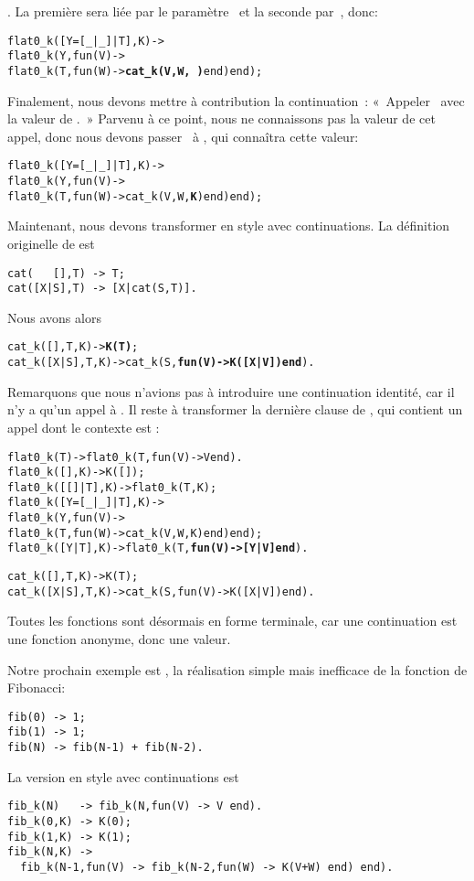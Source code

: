 . La première sera liée par le paramètre~
et la seconde par~, donc:
\begin{alltt}
flat0\_k([Y=[\_|\_]|T],K) ->
  flat0\_k(Y,fun(V) ->
              flat0\_k(T,fun(W) -> \textbf{cat\_k(V,W,\,)} end) end);
\end{alltt}
Finalement, nous devons mettre à contribution la
continuation~: «~Appeler~ avec la valeur de
.~» Parvenu à ce point, nous ne
connaissons pas la valeur de cet appel, donc nous devons
passer~ à , qui connaîtra cette valeur:
\begin{alltt}
flat0\_k([Y=[\_|\_]|T],K) ->
  flat0\_k(Y,fun(V) ->
              flat0\_k(T,fun(W) -> cat\_k(V,W,\textbf{K}) end) end);
\end{alltt}
Maintenant, nous devons transformer  en style avec
continuations. La définition originelle de  est
\begin{verbatim}
cat(   [],T) -> T;
cat([X|S],T) -> [X|cat(S,T)].
\end{verbatim}
Nous avons alors
\begin{alltt}
cat\_k(   [],T,K) -> \textbf{K(T)};
cat\_k([X|S],T,K) -> cat\_k(S,\textbf{fun(V) -> K([X|V]) end}).
\end{alltt}
Remarquons que nous n'avions pas à introduire une continuation
identité, car il n'y a qu'un appel à . Il reste à
transformer la dernière clause de , qui contient un
appel dont le contexte est \erlcode{[Y|\textvisiblespace]}:
\begin{alltt}
flat0\_k(T)             -> flat0\_k(T,fun(V) -> V end).
flat0\_k(         [],K) -> K([]);
flat0\_k(     [[]|T],K) -> flat0\_k(T,K);
flat0\_k([Y=[_|_]|T],K) ->
  flat0\_k(Y,fun(V) ->
              flat0\_k(T,fun(W) -> cat\_k(V,W,K) end) end);
flat0\_k(      [Y|T],K) -> flat0\_k(T,\textbf{fun(V) -> [Y|V] end}).

cat\_k(   [],T,K) -> K(T);
cat\_k([X|S],T,K) -> cat\_k(S,fun(V) -> K([X|V]) end).
\end{alltt}
Toutes les fonctions sont désormais en forme terminale, car une
continuation est une fonction anonyme, donc une valeur.

Notre prochain exemple est , la réalisation simple mais
inefficace de la fonction de Fibonacci:
\begin{verbatim}
fib(0) -> 1;
fib(1) -> 1;
fib(N) -> fib(N-1) + fib(N-2).
\end{verbatim}
La version en style avec continuations est
\begin{verbatim}
fib_k(N)   -> fib_k(N,fun(V) -> V end).
fib_k(0,K) -> K(0);
fib_k(1,K) -> K(1);
fib_k(N,K) ->
  fib_k(N-1,fun(V) -> fib_k(N-2,fun(W) -> K(V+W) end) end).
\end{verbatim}

